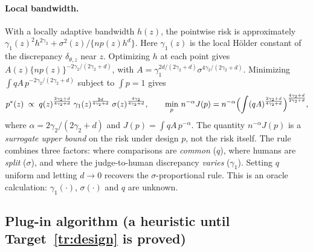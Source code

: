 \paragraph{Local bandwidth.}
With a locally adaptive bandwidth $h(z)$, the pointwise risk is approximately
$\gamma_1(z)^2h^{2\gamma_2}+\sigma^2(z)/\{np(z)h^d\}$. Here $\gamma_1(z)$ is the local H\"older constant
of the discrepancy $\delta_{\theta,z}$ near $z$. Optimizing $h$ at each point gives
$A(z)\{np(z)\}^{-2\gamma_2/(2\gamma_2+d)}$, with $A=\gamma_1^{2d/(2\gamma_2+d)}\sigma^{4\gamma_2/(2\gamma_2+d)}$.
Minimizing $\int qA\,p^{-2\gamma_2/(2\gamma_2+d)}$ subject to $\int p=1$ gives
\begin{equation}
  p^{*}(z)\;\propto\;q(z)^{\frac{2\gamma_2+d}{4\gamma_2+d}}\;
  \gamma_1(z)^{\frac{2d}{4\gamma_2+d}}\;\sigma(z)^{\frac{4\gamma_2}{4\gamma_2+d}},
  \qquad
  \min_p\,n^{-\alpha}J(p)=n^{-\alpha}
  \Bigl(\int (qA)^{\frac{2\gamma_2+d}{4\gamma_2+d}}\Bigr)^{\frac{4\gamma_2+d}{2\gamma_2+d}},
  \label{eq:design}
\end{equation}
where $\alpha=2\gamma_2/(2\gamma_2+d)$ and $J(p)=\int qA\,p^{-\alpha}$. The quantity $n^{-\alpha}J(p)$ is
a \emph{surrogate upper bound} on the risk under design $p$, not the risk itself.
The rule combines three factors: where comparisons are \emph{common} ($q$), where humans are
\emph{split} ($\sigma$), and where the judge-to-human discrepancy \emph{varies} ($\gamma_1$). Setting
$q$ uniform and letting $d\to0$ recovers the $\sigma$-proportional rule. This is an oracle calculation:
$\gamma_1(\cdot)$, $\sigma(\cdot)$ and $q$ are unknown.


\subsection{Plug-in algorithm (a heuristic until Target~\ref{tr:design} is proved)}

